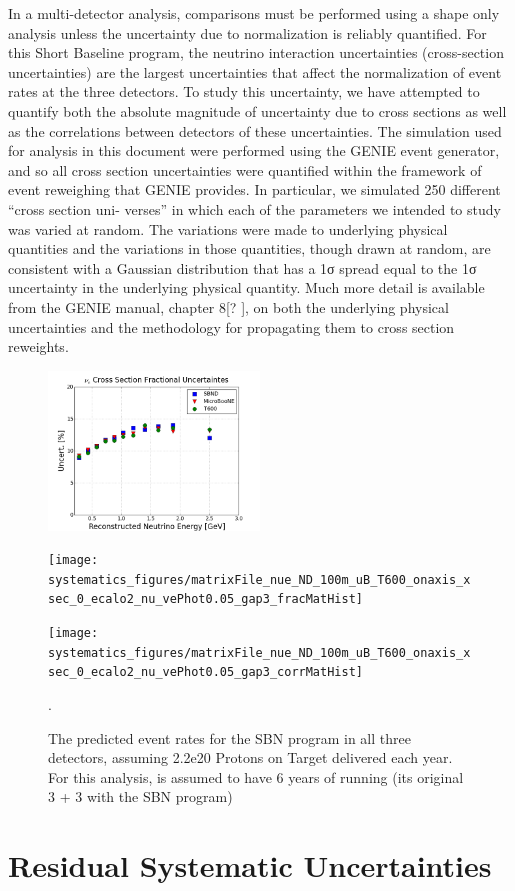 In a multi-detector analysis, comparisons must be performed using a shape only analysis
unless the uncertainty due to normalization is reliably quantified. For this Short Baseline
program, the neutrino interaction uncertainties (cross-section uncertainties) are the largest
uncertainties that affect the normalization of event rates at the three detectors. To study this
uncertainty, we have attempted to quantify both the absolute magnitude of uncertainty due to
cross sections as well as the correlations between detectors of these uncertainties.
The simulation used for analysis in this document were performed using the GENIE event
generator, and so all cross section uncertainties were quantified within the framework of event
reweighing that GENIE provides. In particular, we simulated 250 different “cross section uni-
verses” in which each of the parameters we intended to study was varied at random. The
variations were made to underlying physical quantities and the variations in those quantities,
though drawn at random, are consistent with a Gaussian distribution that has a 1σ spread
equal to the 1σ uncertainty in the underlying physical quantity. Much more detail is available
from the GENIE manual, chapter 8[? ], on both the underlying physical uncertainties and the
methodology for propagating them to cross section reweights.


\begin{figure}[]
    \centering
    \includegraphics[width=0.5\textwidth]{systematics_figures/matrixFile_nue_ND_100m_uB_T600_onaxis_xsec_0_ecalo2_nu_vePhot0.05_gap3_fracUncert}
    \caption{}
   \label{fig:sys_xsec_uncert_fracUncert}
\end{figure}

\begin{figure}[]
    \centering
    \texttt{[image: systematics\_figures/matrixFile\_nue\_ND\_100m\_uB\_T600\_onaxis\_xsec\_0\_ecalo2\_nu\_vePhot0.05\_gap3\_fracMatHist]}
    \caption{}
   \label{fig:syst_xsec_fracmatrix}
\end{figure}
\begin{figure}[]
    \centering
    \texttt{[image: systematics\_figures/matrixFile\_nue\_ND\_100m\_uB\_T600\_onaxis\_xsec\_0\_ecalo2\_nu\_vePhot0.05\_gap3\_corrMatHist]}
    \caption{The predicted event rates for the SBN program in all three detectors, assuming 2.2e20 Protons on Target delivered each year.  For this analysis, \uboone is assumed to have 6 years of running (its original 3 + 3 with the SBN program)}.
   \label{fig:syst_xsec_corrmatrix}
\end{figure}

\section{Residual Systematic Uncertainties}

